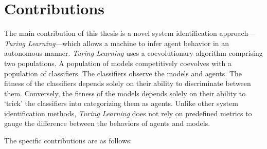 
\section{Contributions}

The main contribution of this thesis is a novel system identification approach---\textit{Turing Learning}---which allows a machine to infer agent behavior in an autonomous manner. \textit{Turing Learning} uses a coevolutionary algorithm comprising two populations. A population of models competitively coevolves with a population of classifiers. The classifiers observe the models and agents. The fitness of the classifiers depends solely on their ability to discriminate between them. Conversely, the fitness of the models depends solely on their ability to `trick' the classifiers into categorizing them as agents. Unlike other system identification methods, \textit{Turing Learning} does not rely on predefined metrics to gauge the difference between the behaviors of agents and models. 

The specific contributions are as follows:

